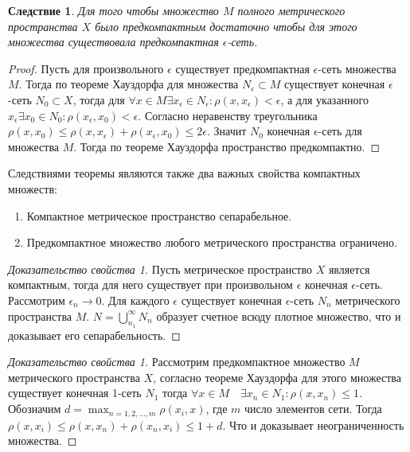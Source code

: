 \documentclass[14pt,a4paper]{extarticle}
\newtheorem{corollary}{Следствие}[theorem]
\theoremstyle{definition}
\theoremstyle{remark}
\renewcommand{\[}{\begin{dmath*}[compact]}
\renewcommand{\]}{\end{dmath*}}
\newcommand{\be}{\begin{enumerate}}
\newcommand{\ee}{\end{enumerate}}
\begin{document}
\begin{corollary}
  Для того чтобы множество $M$ полного метрического пространства $X$
  было предкомпактным достаточно чтобы для этого множества
  существовала предкомпактная $\epsilon$-сеть.
\end{corollary}

\begin{proof}
  Пусть для произвольного $\epsilon$ существует предкомпактная $\epsilon$-сеть
  множества $M$.
  Тогда по теореме Хауздорфа для множества $N_\epsilon \subset M$
  существует конечная $\epsilon$-сеть $N_0 \subset X$, тогда для
  $\forall x \in M \exists x_\epsilon \in N_\epsilon:
  \rho(x,x_\epsilon) < \epsilon$, а для указанного
  $x_\epsilon \exists x_0\in N_0: \rho(x_\epsilon,x_0)<\epsilon$.
  Согласно неравенству треугольника
  $\rho(x,x_0)\leq \rho(x,x_\epsilon) + \rho(x_\epsilon,x_0) \leq 2\epsilon$.
  Значит $N_0$ конечная $\epsilon$-сеть для множества $M$.
  Тогда по теореме Хауздорфа пространство предкомпактно.
\end{proof}

Следствиями теоремы являются также два важных свойства компактных множеств:

\be
  \item Компактное метрическое пространство сепарабельное.
  \item Предкомпактное множество любого метрического пространства ограничено.
\ee

\begin{proof}[Доказательство свойства 1]
  Пусть метрическое пространство $X$ является компактным,
  тогда для него существует при произвольном $\epsilon$
  конечная $\epsilon$-сеть.
  Рассмотрим $\epsilon_n \to 0$. Для каждого $\epsilon$ существует конечная
  $\epsilon$-сеть $N_n$ метрического пространства $M$.
  $N=\bigcup _{n_1}^{\infty} N_n$ образует счетное всюду плотное множество,
  что и доказывает его сепарабельность.
\end{proof}

\begin{proof}[Доказательство свойства 1]
  Рассмотрим предкомпактное множество $M$
  метрического пространства $X$, согласно теореме Хауздорфа для этого множества
  существует конечная 1-сеть $N_1$ тогда
  $\forall x \in M\quad \exists x_n \in N_1: \rho(x, x_n) \leq 1$.
  Обозначим $d=\max_{n=1,2,\dots,m}\rho(x_i,x)$, где $m$ число элементов сети.
  Тогда $\rho(x, x_i) \leq \rho(x, x_n)+\rho(x_n, x_i) \leq 1+d$.
  Что и доказывает неограниченность множества.
\end{proof}
\end{document}
